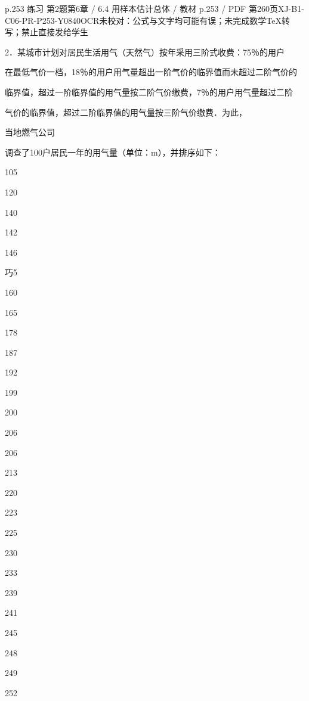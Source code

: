 \begin{bankitem}{p.253 练习 第2题}{第6章 / 6.4 用样本估计总体 / 教材 p.253 / PDF 第260页}{XJ-B1-C06-PR-P253-Y0840}{OCR未校对：公式与文字均可能有误；未完成数学TeX转写；禁止直接发给学生}
\begin{ocrdraft}
\par
2．某城市计划对居民生活用气（天然气）按年采用三阶式收费：75％的用户
\par
在最低气价一档，18％的用户用气量超出一阶气价的临界值而未超过二阶气价的
\par
临界值，超过一阶临界值的用气量按二阶气价缴费，7％的用户用气量超过二阶
\par
气价的临界值，超过二阶临界值的用气量按三阶气价缴费．为此，
\par
当地燃气公司
\par
调查了100户居民一年的用气量（单位：m），并排序如下：
\par
105
\par
120
\par
140
\par
142
\par
146
\par
巧5
\par
160
\par
165
\par
178
\par
187
\par
192
\par
199
\par
200
\par
206
\par
206
\par
213
\par
220
\par
223
\par
225
\par
230
\par
233
\par
239
\par
241
\par
245
\par
248
\par
249
\par
252
\par

\end{ocrdraft}
\end{bankitem}
